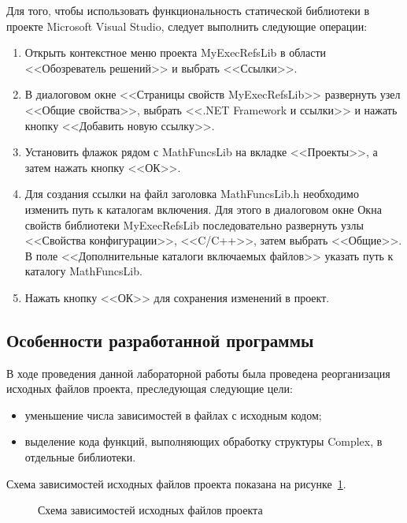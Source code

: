 Для того, чтобы использовать функциональность статической библиотеки в проекте
Microsoft Visual Studio, следует выполнить следующие операции:

\begin{enumerate}
\item
  Открыть контекстное меню проекта MyExecRefsLib в области
  <<Обозреватель решений>> и выбрать <<Ссылки>>.
\item
  В диалоговом окне <<Страницы свойств MyExecRefsLib>> развернуть узел <<Общие свойства>>,
  выбрать <<.NET Framework и ссылки>> и нажать кнопку <<Добавить новую ссылку>>.
\item
  Установить флажок рядом с MathFuncsLib на вкладке <<Проекты>>,
  а затем нажать кнопку <<ОК>>.
\item
  Для создания ссылки на файл заголовка MathFuncsLib.h необходимо изменить путь
  к каталогам включения.
  Для этого в диалоговом окне Окна свойств библиотеки MyExecRefsLib последовательно
  развернуть узлы <<Свойства конфигурации>>, <<C/C++>>, затем выбрать <<Общие>>.
  В поле <<Дополнительные каталоги включаемых файлов>> указать путь к каталогу
  MathFuncsLib.
\item
  Нажать кнопку <<ОК>> для сохранения изменений в проект.
\end{enumerate}

\pagebreak 

\subsection{Особенности разработанной программы}

В ходе проведения данной лабораторной работы была проведена реорганизация 
исходных файлов проекта, преследующая следующие цели:

\begin{itemize}
\item уменьшение числа зависимостей в файлах с исходным кодом;
\item выделение кода функций, выполняющих обработку структуры Complex, 
  в отдельные библиотеки.
\end{itemize}

Схема зависимостей исходных файлов проекта показана на рисунке~\ref{fig:dependencies}.

\begin{figure}[htbp]
  \centering
  \small{
    
  }
  \caption{Схема зависимостей исходных файлов проекта}\label{fig:dependencies}
\end{figure}

